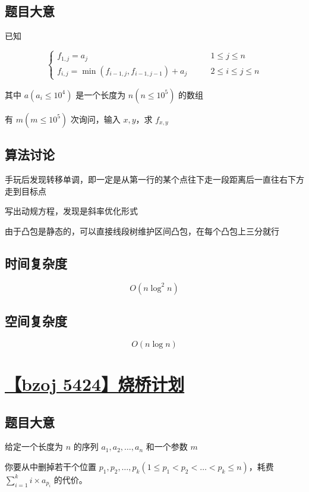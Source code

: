 \documentclass[UTF8]{article}
\begin{document}
\subsection{题目大意}

已知

$$
\begin{cases}
f_{1,j}=a_j &\qquad 1 \le j \le n \\
f_{i,j}=\min(f_{i-1,j},f_{i-1,j-1})+a_j &\qquad 2 \le i \le j \le n
\end{cases}
$$

其中 $a(a_i \le 10^4)$ 是一个长度为 $n(n \le 10^5)$ 的数组

有 $m(m \le 10^5)$ 次询问，输入 $x,y$，求 $f_{x,y}$

\subsection{算法讨论}

手玩后发现转移单调，即一定是从第一行的某个点往下走一段距离后一直往右下方走到目标点

写出动规方程，发现是斜率优化形式

由于凸包是静态的，可以直接线段树维护区间凸包，在每个凸包上三分就行

\subsection{时间复杂度}

$$
O(n \log^2 n)
$$

\subsection{空间复杂度}

$$
O(n \log n)
$$

\section{\href{https://www.lydsy.com/JudgeOnline/problem.php?id=5424}{【bzoj 5424】烧桥计划}}

\subsection{题目大意}

给定一个长度为 $n$ 的序列 $a_1,a_2,\dots,a_n$ 和一个参数 $m$

你要从中删掉若干个位置 $p_1,p_2, \dots ,p_k  (1 \le p_1 < p_2 < \dots < p_k \le n)$，耗费 $\sum_{i=1}^{k}i \times a_{p_i}$ 的代价。
\end{document}
